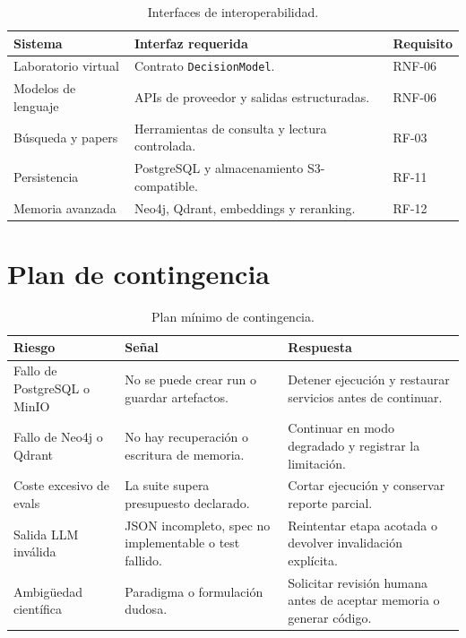 \begin{table}[H]
\begin{center}
\small
\begin{tabular}{|p{3.2cm}|p{6.2cm}|p{2.5cm}|} \hline
\textbf{Sistema} & \textbf{Interfaz requerida} & \textbf{Requisito} \\ \hline
Laboratorio virtual & Contrato \texttt{DecisionModel}. & RNF-06 \\ \hline
Modelos de lenguaje & APIs de proveedor y salidas estructuradas. & RNF-06 \\ \hline
Búsqueda y papers & Herramientas de consulta y lectura controlada. & RF-03 \\ \hline
Persistencia & PostgreSQL y almacenamiento S3-compatible. & RF-11 \\ \hline
Memoria avanzada & Neo4j, Qdrant, embeddings y reranking. & RF-12 \\ \hline
\end{tabular}
\caption{Interfaces de interoperabilidad.}
\end{center}
\end{table}

\section{Plan de contingencia}

\begin{table}[H]
\begin{center}
\small
\begin{tabular}{|p{3.2cm}|p{4.6cm}|p{4.6cm}|} \hline
\textbf{Riesgo} & \textbf{Señal} & \textbf{Respuesta} \\ \hline
Fallo de PostgreSQL o MinIO & No se puede crear run o guardar artefactos. & Detener ejecución y restaurar servicios antes de continuar. \\ \hline
Fallo de Neo4j o Qdrant & No hay recuperación o escritura de memoria. & Continuar en modo degradado y registrar la limitación. \\ \hline
Coste excesivo de evals & La suite supera presupuesto declarado. & Cortar ejecución y conservar reporte parcial. \\ \hline
Salida LLM inválida & JSON incompleto, spec no implementable o test fallido. & Reintentar etapa acotada o devolver invalidación explícita. \\ \hline
Ambigüedad científica & Paradigma o formulación dudosa. & Solicitar revisión humana antes de aceptar memoria o generar código. \\ \hline
\end{tabular}
\caption{Plan mínimo de contingencia.}
\end{center}
\end{table}

